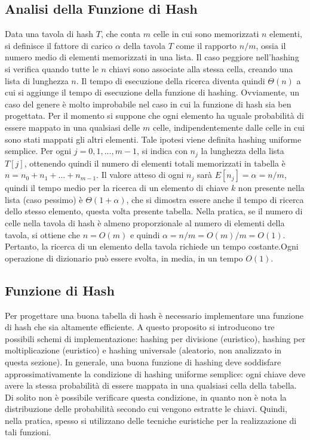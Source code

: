 \subsection{Analisi della Funzione di Hash}
Data una tavola di hash \(T\), che conta \(m\) celle in cui sono memorizzati \(n\) elementi, si definisce il fattore di carico \(\alpha\) della tavola \(T\) come il rapporto \(n/m\), ossia il numero medio di elementi memorizzati in una lista. Il caso peggiore nell'hashing si verifica quando tutte le \(n\) chiavi sono associate alla stessa cella, creando una lista di lunghezza \(n\). Il tempo di esecuzione della ricerca diventa quindi \(\Theta(n)\) a cui si aggiunge il tempo di esecuzione della funzione di hashing. Ovviamente, un caso del genere è molto improbabile nel caso in cui la funzione di hash sia ben progettata. Per il momento si suppone che ogni elemento ha uguale probabilità di essere mappato in una qualsiasi delle \(m\) celle, indipendentemente dalle celle in cui sono stati mappati gli altri elementi. Tale ipotesi viene definita hashing uniforme semplice. Per ogni \(j=0,1,..., m-1\), si indica con \(n_j\) la lunghezza della lista \(T[j]\), ottenendo quindi il numero di elementi totali memorizzati in tabella è \(n=n_0+n_1+...+n_{m-1}\). Il valore atteso di ogni \(n_j\) sarà \(E[n_j] = \alpha = n/m\), quindi il tempo medio per la ricerca di un elemento di chiave \(k\) non presente nella lista (caso pessimo) è \(\Theta(1+\alpha)\), che si dimostra essere anche il tempo di ricerca dello stesso elemento, questa volta presente tabella. Nella pratica, se il numero di celle nella tavola di hash è almeno proporzionale al numero di elementi della tavola, si ottiene che \(n=O(m)\) e quindi \(\alpha = n/m = O(m)/m = O(1)\). Pertanto, la ricerca di un elemento della tavola richiede un tempo costante.Ogni operazione di dizionario può essere svolta, in media, in un tempo \(O(1)\).

\subsection{Funzione di Hash}
Per progettare una buona tabella di hash è necessario implementare una funzione di hash che sia altamente efficiente. A questo proposito si introducono tre possibili schemi di implementazione: hashing per divisione (euristico), hashing per moltiplicazione (euristico) e hashing universale (aleatorio, non analizzato in questa sezione). In generale, una buona funzione di hashing deve soddisfare approssimativamente la condizione di hashing uniforme semplice: ogni chiave deve avere la stessa probabilità di essere mappata in una qualsiasi cella della tabella. Di solito non è possibile verificare questa condizione, in quanto non è nota la distribuzione delle probabilità secondo cui vengono estratte le chiavi. Quindi, nella pratica, spesso si utilizzano delle tecniche euristiche per la realizzazione di tali funzioni.

